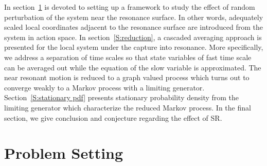 In section~\ref{S:problem setup} is devoted to setting up a framework to study the effect of random perturbation of the system near the resonance surface. In other words, adequately scaled local coordinates adjacent to the resonance surface are introduced from the system in action space. In section~\ref{S:reduction}, a cascaded averaging approach is presented for the local system under the capture into resonance. More specifically, we address a separation of time scales so that state variables of fast time scale can be averaged out while the equation of the slow variable is approximated. The near resonant motion is reduced to a graph valued process which turns out to converge weakly to a Markov process with a limiting generator. Section~\ref{S:stationary pdf} presents stationary probability density from the limiting generator which characterize the reduced Markov process. In the final section, we give conclusion and conjecture regarding the effect of SR.

\section{Problem Setting}
\label{S:problem setup}


